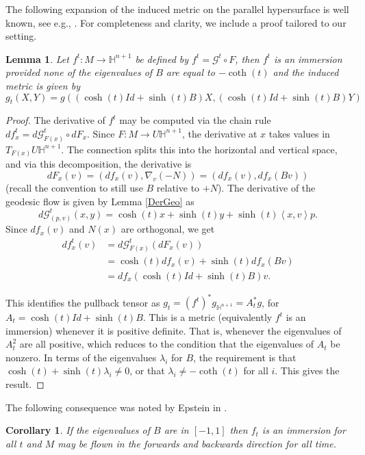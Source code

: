 \documentclass{amsart}
\newtheorem{lem}[thm]{Lemma}
\newtheorem{cor}[thm]{Corollary}
\renewcommand{\H}{\mathbb{H}}
\begin{document}
The following expansion of the induced metric on the parallel hypersurface is well known, see e.g., \cite{Krasnov-Schlenker2007}.
For completeness and clarity, we include a proof tailored to our setting. 

\begin{lem}
Let $f^t: M \to \H^{n+1}$ be defined by $f^t = \mathcal{G}^t \circ F$, then $f^t$ is an immersion provided none of the eigenvalues of $B$ are equal to $-\coth(t)$ and the induced metric is given by 
\[
g_t(X,Y) = g( (\cosh(t)Id + \sinh(t)B)X, (\cosh(t)Id + \sinh(t)B)Y)
\]
\end{lem}

\begin{proof}
The derivative of $f^t$ may be computed via the chain rule $df^t_x = d\mathcal{G}^t_{F(x)} \circ dF_x$.
Since $F: M \to U\H^{n+1}$, the derivative at $x$ takes values in $T_{F(x)}U\H^{n+1}$.
The connection splits this into the horizontal and vertical space, and via this decomposition, the derivative is 
\[
dF_x(v) = (df_x(v),\nabla_v(-N)) = (df_x(v),df_x(Bv))
\]
(recall the convention to still use $B$ relative to $+N$).
The derivative of the geodesic flow is given by Lemma \ref{DerGeo} as
\[
d\mathcal{G}^t_{(p,v)}(x,y) = \cosh(t)x + \sinh(t)y + \sinh(t)\left< x,v \right> p.
\]
Since $df_x(v)$ and $N(x)$ are orthogonal, we get
\begin{align*}
df^t_x(v) &= d\mathcal{G}^t_{F(x)}(dF_x(v)) \\
&= \cosh(t)df_x(v) + \sinh(t)df_x(Bv) \\
&= df_x(\cosh(t)Id + \sinh(t)B)v.
\end{align*}


This identifies the pullback tensor as $g_t = (f^t)^*g_{\H^{n+1}} = A_t^*g$, for $A_t = \cosh(t)Id + \sinh(t)B$.
This is a metric (equivalently $f^t$ is an immersion) whenever it is positive definite.
That is, whenever the eigenvalues of $A_t^2$ are all positive, which reduces to the condition that the eigenvalues of $A_t$ be nonzero. 
In terms of the eigenvalues $\lambda_i$ for $B$, the requirement is that $\cosh(t) + \sinh(t)\lambda_i \neq 0$, or that $\lambda_i \neq -\coth(t)$ for all $i$. 
This gives the result.
\end{proof}

The following consequence was noted by Epstein in \cite{Epstein1984}.

\begin{cor}
If the eigenvalues of $B$ are in $[-1,1]$ then $f_t$ is an immersion for all $t$ and $M$ may be flown in the forwards and backwards direction for all time. 
\end{cor}
\end{document}
